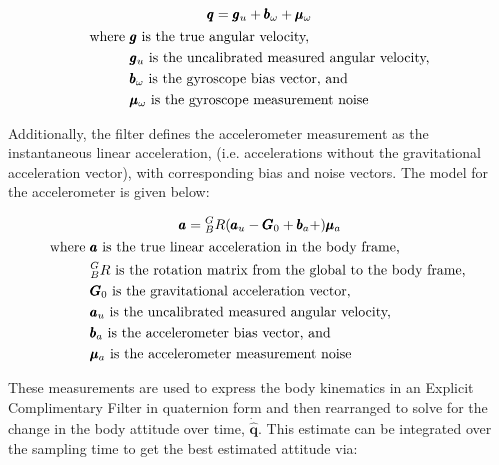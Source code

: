 \begin{gather} \labeq{mahony_gyroscope_model}
    \pmb{q} = \pmb{g}_u + \pmb{b}_\omega + \pmb{\mu}_\omega \\
    \begin{aligned}
        \text{where } &\pmb{g} \text{ is the true angular velocity,} \\
                      &\pmb{g}_u \text{ is the uncalibrated measured angular velocity,} \\
                      &\pmb{b}_\omega \text{ is the gyroscope bias vector, and}  \\
                      &\pmb{\mu}_\omega \text{ is the gyroscope measurement noise}
    \end{aligned} \notag
\end{gather}

Additionally, the filter defines the accelerometer measurement as the instantaneous linear acceleration, (i.e. accelerations without the gravitational acceleration vector), with corresponding bias and noise vectors.
The model for the accelerometer is given below:

\begin{gather} \labeq{mahony_accelerometer_model}
    \pmb{a} = {}^G_B R (\pmb{a}_u - \pmb{G}_0 + \pmb{b}_a + )\pmb{\mu}_a \\
    \begin{aligned}
        \text{where } &\pmb{a} \text{ is the true linear acceleration in the body frame,} \\
                      &{}^G_B R \text{ is the rotation matrix from the global to the body frame, } \\
                      &\pmb{G}_0 \text{ is the gravitational acceleration vector,} \\
                      &\pmb{a}_u \text{ is the uncalibrated measured angular velocity, } \\
                      &\pmb{b}_a \text{ is the accelerometer bias vector, and}  \\
                      &\pmb{\mu}_a \text{ is the accelerometer measurement noise}
    \end{aligned} \notag
\end{gather}

These measurements are used to express the body kinematics in an Explicit Complimentary Filter in quaternion form and then rearranged to solve for the change in the body attitude over time, $\pmb{\dot{\hat{q}}}$.
This estimate can be integrated over the sampling time to get the best estimated attitude via:

